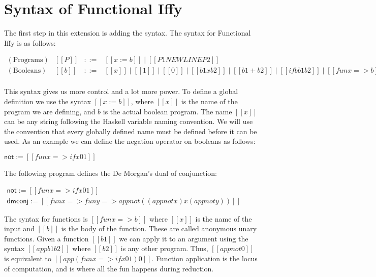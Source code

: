 \documentclass{article}
\begin{document}
\section{Syntax of Functional Iffy}
\label{sec:syntax_of_functional_iffy}
The first step in this extension is adding the syntax.  The syntax for
Functional Iffy is as follows:
\begin{center}
  \begin{math}
    \begin{array}{lllllllll}
      (\text{Programs}) & [[P]] & ::= & [[x := b]] \mid [[P1 NEWLINE P2]]\\
      (\text{Booleans}) & [[b]] & ::= & [[x]] \mid [[1]] \mid [[0]] \mid
           [[b1 x b2]] \mid [[b1 + b2]] \mid [[if b b1 b2]] \mid
           [[fun x => b]] \mid [[app b1 b2]]\\
    \end{array}
  \end{math}
\end{center}
This syntax gives us more control and a lot more power.  To define a
global definition we use the syntax $[[x := b]]$, where $[[x]]$ is the
name of the program we are defining, and $b$ is the actual boolean
program.  The name $[[x]]$ can be any string following the Haskell
variable naming convention.  We will use the convention that every
globally defined name must be defined before it can be used.  As an
example we can define the negation operator on booleans as follows:
\begin{center}
  \begin{math}
    \mathsf{not} := [[fun x => if x 0 1]]
  \end{math}
\end{center}
The following program defines the De Morgan's dual of conjunction:
\begin{center}
  \begin{math}
    \begin{array}{lll}
      \mathsf{not} := [[fun x => if x 0 1]]\\
      \mathsf{dmconj} := [[fun x => fun y => app not ((app not x) x
          (app not y))]]
    \end{array}
  \end{math}
\end{center}
The syntax for functions is $[[fun x => b]]$ where $[[x]]$ is the
name of the input and $[[b]]$ is the body of the function.  These are
called anonymous unary functions.  Given a function $[[b1]]$ we can
apply it to an argument using the syntax $[[app b1 b2]]$ where
$[[b2]]$ is any other program. Thus, $[[app not 0]]$ is equivalent to
$[[app (fun x => if x 0 1) 0]]$.  Function application is the locus of
computation, and is where all the fun happens during reduction.  
\end{document}
